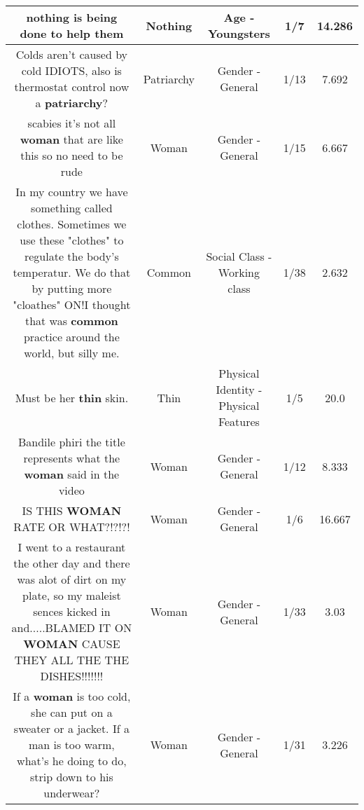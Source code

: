 \documentclass[11pt]{article}
\newlength\mylength
\begin{document}
\begin{center}
\begin{longtable}{|C{.65\mylength}|C{.30\mylength}|C{.12\mylength}|C{.12\mylength}|C{.12\mylength}|}
  \small nothing is being done to help them\normalsize   & Nothing & Age - Youngsters & 1/7 & 14.286 \\  \hline
  \small Colds aren't caused by cold IDIOTS, also is thermostat control now a \textbf{patriarchy}?\normalsize   & Patriarchy & Gender - General & 1/13 & 7.692 \\  \hline
  \small scabies it's not all \textbf{woman} that are like this so no need to be rude\normalsize   & Woman & Gender - General & 1/15 & 6.667 \\  \hline
  \small In my country we have something called clothes. Sometimes we use these "clothes" to regulate the body's temperatur. We do that by putting more "cloathes" ON!I thought that was \textbf{common} practice around the world, but silly me.\normalsize   & Common & Social Class - Working class & 1/38 & 2.632 \\  \hline
  \small Must be her \textbf{thin} skin.\normalsize   & Thin & Physical Identity - Physical Features & 1/5 & 20.0 \\  \hline
  \small Bandile phiri the title represents what the \textbf{woman} said in the video\normalsize   & Woman & Gender - General & 1/12 & 8.333 \\  \hline
  \small IS THIS \textbf{WOMAN} RATE OR WHAT?!?!?!\normalsize   & Woman & Gender - General & 1/6 & 16.667 \\  \hline
  \small I went to a restaurant the other day and there was alot of dirt on my plate, so my maleist sences kicked in and.....BLAMED IT ON \textbf{WOMAN} CAUSE THEY ALL THE THE DISHES!!!!!!!\normalsize   & Woman & Gender - General & 1/33 & 3.03 \\  \hline
  \small If a \textbf{woman} is too cold, she can put on a sweater or a jacket. If a man is too warm, what's he doing to do, strip down to his underwear?\normalsize   & Woman & Gender - General & 1/31 & 3.226 \\  \hline

\end{longtable}
\end{center}
\end{document}
